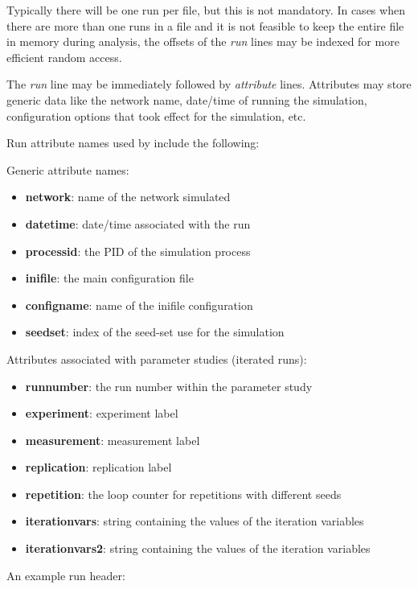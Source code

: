 Typically there will be one run per file, but this is not mandatory.
In cases when there are more than one runs in a file and it is not feasible
to keep the entire file in memory during analysis, the offsets of the \textit{run}
lines may be indexed for more efficient random access.

The \textit{run} line may be immediately followed by \textit{attribute} lines.
Attributes may store generic data like the network name, date/time of running
the simulation, configuration options that took effect for the simulation, etc.

Run attribute names used by {\opp} include the following:

Generic attribute names:

\begin{itemize}
    \item \textbf{network}: name of the network simulated
    \item \textbf{datetime}: date/time associated with the run
    \item \textbf{processid}: the PID of the simulation process
    \item \textbf{inifile}: the main configuration file
    \item \textbf{configname}: name of the inifile configuration
    \item \textbf{seedset}: index of the seed-set use for the simulation
\end{itemize}

Attributes associated with parameter studies (iterated runs):

\begin{itemize}
    \item \textbf{runnumber}: the run number within the parameter study
    \item \textbf{experiment}: experiment label
    \item \textbf{measurement}: measurement label
    \item \textbf{replication}: replication label
    \item \textbf{repetition}: the loop counter for repetitions with different seeds
    \item \textbf{iterationvars}: string containing the values of the iteration variables
    \item \textbf{iterationvars2}: string containing the values of the iteration variables
\end{itemize}


An example run header:

